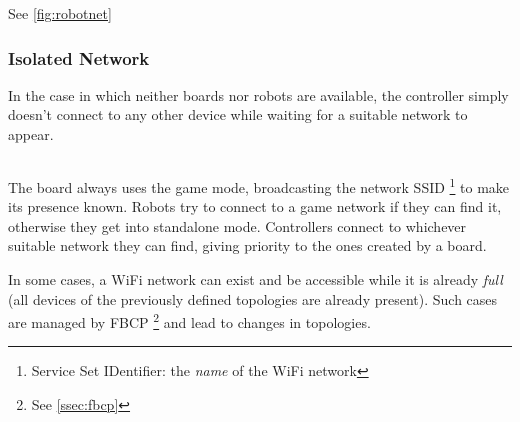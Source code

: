   See \autoref{fig:robotnet}

\subsubsection{Isolated Network}
  In the case in which neither boards nor robots are available, the
  controller simply doesn't connect to any other device while
  waiting for a suitable network to appear.

\subsection*{}
The board always uses the game mode, broadcasting the network SSID%
\footnote{Service Set IDentifier: the \textit{name} of the WiFi
network} to make its presence known. Robots try to connect to a game
network if they can find it, otherwise they get into standalone
mode. Controllers connect to whichever suitable network they can
find, giving priority to the ones created by a board.

In some cases, a WiFi network can exist and be accessible while it
is already \textit{full} (all devices of the previously defined
topologies are already present). Such cases are managed by FBCP%
\footnote{See \autoref{ssec:fbcp}} and lead to changes in topologies.

